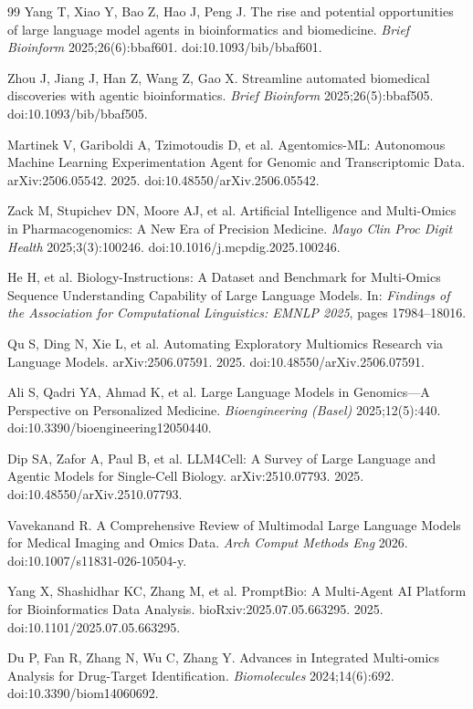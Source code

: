 \documentclass[11pt,letterpaper]{article}
\begin{document}
\begin{thebibliography}{99}
Yang T, Xiao Y, Bao Z, Hao J, Peng J.
The rise and potential opportunities of large language model agents in bioinformatics and biomedicine.
\textit{Brief Bioinform} 2025;26(6):bbaf601.
doi:10.1093/bib/bbaf601.

Zhou J, Jiang J, Han Z, Wang Z, Gao X.
Streamline automated biomedical discoveries with agentic bioinformatics.
\textit{Brief Bioinform} 2025;26(5):bbaf505.
doi:10.1093/bib/bbaf505.

Martinek V, Gariboldi A, Tzimotoudis D, et al.
Agentomics-ML: Autonomous Machine Learning Experimentation Agent for Genomic and Transcriptomic Data.
arXiv:2506.05542. 2025.
doi:10.48550/arXiv.2506.05542.

Zack M, Stupichev DN, Moore AJ, et al.
Artificial Intelligence and Multi-Omics in Pharmacogenomics: A New Era of Precision Medicine.
\textit{Mayo Clin Proc Digit Health} 2025;3(3):100246.
doi:10.1016/j.mcpdig.2025.100246.

He H, et al.
Biology-Instructions: A Dataset and Benchmark for Multi-Omics Sequence Understanding Capability of Large Language Models.
In: \textit{Findings of the Association for Computational Linguistics: EMNLP 2025}, pages 17984--18016.

Qu S, Ding N, Xie L, et al.
Automating Exploratory Multiomics Research via Language Models.
arXiv:2506.07591. 2025.
doi:10.48550/arXiv.2506.07591.

Ali S, Qadri YA, Ahmad K, et al.
Large Language Models in Genomics---A Perspective on Personalized Medicine.
\textit{Bioengineering (Basel)} 2025;12(5):440.
doi:10.3390/bioengineering12050440.

Dip SA, Zafor A, Paul B, et al.
LLM4Cell: A Survey of Large Language and Agentic Models for Single-Cell Biology.
arXiv:2510.07793. 2025.
doi:10.48550/arXiv.2510.07793.

Vavekanand R.
A Comprehensive Review of Multimodal Large Language Models for Medical Imaging and Omics Data.
\textit{Arch Comput Methods Eng} 2026.
doi:10.1007/s11831-026-10504-y.

Yang X, Shashidhar KC, Zhang M, et al.
PromptBio: A Multi-Agent AI Platform for Bioinformatics Data Analysis.
bioRxiv:2025.07.05.663295. 2025.
doi:10.1101/2025.07.05.663295.

Du P, Fan R, Zhang N, Wu C, Zhang Y.
Advances in Integrated Multi-omics Analysis for Drug-Target Identification.
\textit{Biomolecules} 2024;14(6):692.
doi:10.3390/biom14060692.


\end{thebibliography}
\end{document}
